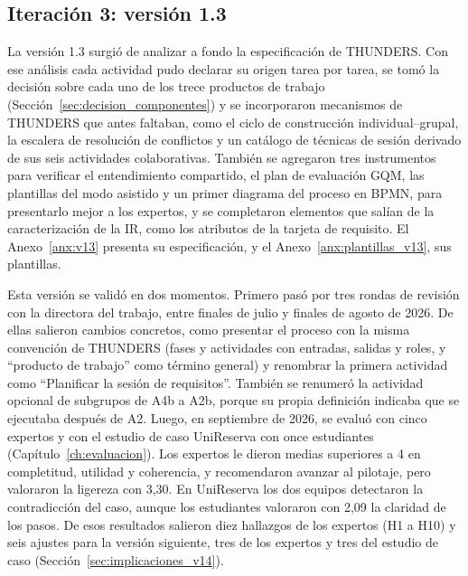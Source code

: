 \documentclass[12pt,letterpaper,oneside]{report}
\begin{document}
\subsection{Iteración 3: versión 1.3}
La versión 1.3 surgió de analizar a fondo la especificación de THUNDERS. Con ese
análisis cada actividad pudo declarar su origen tarea por tarea, se tomó la
decisión sobre cada uno de los trece productos de trabajo
(Sección~\ref{sec:decision_componentes}) y se incorporaron mecanismos de
THUNDERS que antes faltaban, como el ciclo de
construcción individual--grupal, la escalera de resolución de conflictos y un
catálogo de técnicas de sesión derivado de sus seis actividades colaborativas.
También se agregaron tres instrumentos para verificar el entendimiento compartido, el plan
de evaluación GQM, las plantillas del modo asistido y un primer diagrama del
proceso en BPMN, para presentarlo mejor a los expertos, y se completaron elementos
que salían de la caracterización de la IR, como los atributos de la tarjeta de
requisito. El Anexo~\ref{anx:v13} presenta su especificación, y el
Anexo~\ref{anx:plantillas_v13}, sus plantillas.

Esta versión se validó en dos momentos. Primero pasó por tres rondas de revisión
con la directora del trabajo, entre finales de julio y finales de agosto de
2026. De ellas salieron cambios concretos, como presentar el proceso con la
misma convención de THUNDERS (fases y actividades con entradas, salidas y roles,
y ``producto de trabajo'' como término general) y renombrar la primera actividad
como ``Planificar la sesión de requisitos''. También se renumeró la actividad
opcional de subgrupos de A4b a A2b, porque su propia definición indicaba que se
ejecutaba
después de A2. Luego, en septiembre de 2026, se evaluó con cinco expertos y con
el estudio de caso UniReserva con once estudiantes
(Capítulo~\ref{ch:evaluacion}). Los expertos le dieron medias superiores a 4 en
completitud, utilidad y coherencia, y recomendaron avanzar al pilotaje, pero
valoraron la ligereza con 3,30. En UniReserva los dos equipos detectaron la contradicción del caso, aunque los
estudiantes valoraron con 2,09 la claridad de los pasos. De esos resultados salieron diez hallazgos de los
expertos (H1 a H10) y seis ajustes para la versión siguiente, tres de los
expertos y tres del estudio de caso (Sección~\ref{sec:implicaciones_v14}).
\end{document}
